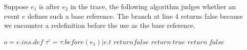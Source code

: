 Suppose $e_1$ is after $e_2$ in the trace, the following algorithm judges whether an event $e$ defines such a base reference.  The branch at line 4 returns false because we encounter a redefinition before the use as the base reference.  

\begin{algorithmic}[3]
\State $o = e.ins.def$
\State $\tau'=\tau.before(e_1)|e.t$
\State $return false$
\Else
{
    \State $ return \ true$
    \EndIf
}
\EndIf
\EndFor
\State $return \ false$
\end{algorithmic}



























